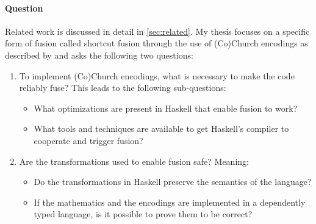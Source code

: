 \paragraph{Question}
Related work is discussed in detail in \autoref{sec:related}.
My thesis focuses on a specific form of fusion called shortcut fusion through the use of (Co)Church encodings as described by \cite{Harper2011} and asks the following two questions:
\begin{enumerate}
  \item To implement (Co)Church encodings, what is necessary to make the code reliably fuse? This leads to the following sub-questions:
  \begin{itemize}
    \item What optimizations are present in Haskell that enable fusion to work?
    \item What tools and techniques are available to get Haskell's compiler to cooperate and trigger fusion?
  \end{itemize}
  \item Are the transformations used to enable fusion safe? Meaning:
  \begin{itemize}
    \item Do the transformations in Haskell preserve the semantics of the language?
    \item If the mathematics and the encodings are implemented in a dependently typed language, is it possible to prove them to be correct?
  \end{itemize}
\end{enumerate}

